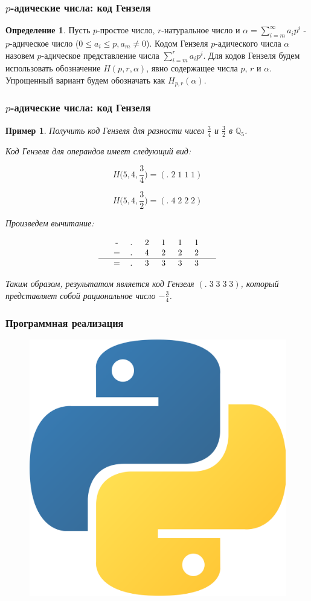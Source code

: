 \documentclass[10pt,professionalfont,utf8,presentation,compress]{beamer}
\theoremstyle{definition}
\newtheorem{defn}{Определение}
\theoremstyle{plain}
\newtheorem{exmp}{Пример}
\begin{document}


\begin{frame}
\frametitle{$p$-адические числа: код Гензеля}
\begin{defn}
Пусть $p$-простое число, $r$-натуральное число и $\alpha=\sum\limits^{\infty}_{i=m} a_ip^i$ - $p$-адическое число ($0 \le a_i \le p, a_m \neq 0$). Кодом Гензеля $p$-адического числа $\alpha$ назовем $p$-адическое представление числа $\sum\limits_{i=m}^{r}a_ip^i$. Для кодов Гензеля будем использовать обозначение $H(p,r,\alpha)$, явно содержащее числа $p$, $r$ и $\alpha$. Упрощенный вариант будем обозначать как $H_{p,r}(\alpha)$.
\end{defn}
\end{frame}


\begin{frame}
\frametitle{$p$-адические числа: код Гензеля}
\begin{exmp}
Получить код Гензеля для разности чисел $\frac{3}{4}$ и $\frac{3}{2}$ в $\mathbb{Q}_5$.

\noindent Код Гензеля для операндов имеет следующий вид:

$$H\bigg(5,4, \frac{3}{4}\bigg)=(.\; 2\; 1\; 1\; 1)$$

$$H\bigg(5,4, \frac{3}{2}\bigg)=(.\; 4\; 2\; 2\; 2)$$


\noindent Произведем вычитание:

$$
\begin{tabular}{ccccccccccc}
& - & .\; & 2\; & 1\; & 1\; & 1\; &  \\
& = & .\; & 4\; & 2\; & 2\; & 2\; &  \\
\hline
& = & .\; & 3\; & 3\; & 3\; & 3\; &
\end{tabular}
$$

\noindent Таким образом, результатом является код Гензеля $(.\; 3\; 3\; 3\; 3)$, который представляет собой рациональное число $-\frac{3}{4}$.
\end{exmp}
\end{frame}


\begin{frame}
\frametitle{Программная реализация}
	\begin{figure}[H]
	\centerline{\includegraphics[width=0.5\linewidth]{images/python.png}}
	\end{figure}
\end{frame}
\end{document}
